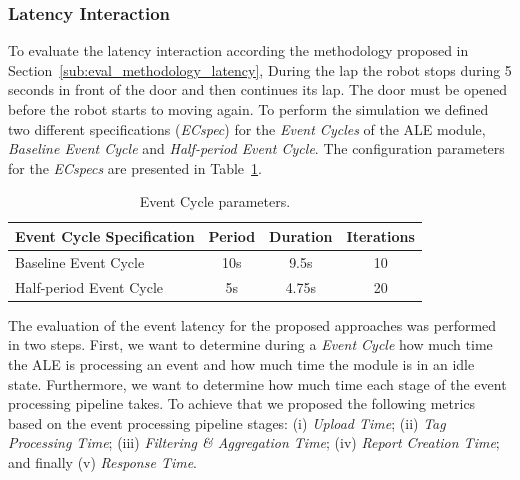 \subsubsection{Latency Interaction}
\label{subs:eval_exp_latency}
To evaluate the latency interaction according the methodology proposed in Section~\ref{sub:eval_methodology_latency},
During the lap the robot stops during 5 seconds in front of the door and then continues its lap.
The door must be opened before the robot starts to moving again. To perform the simulation we defined
two different specifications (\textit{ECspec}) for the \textit{Event Cycles} of the \gls{ALE} module,
\textit{Baseline Event Cycle} and \textit{Half-period Event Cycle}. The configuration parameters
for the \textit{ECspecs} are presented in Table~\ref{table:ecspec_parameters}.

\begin{table}[ht!]
 \begin{tabular}{|l|c|c|c|}
  \hline
  Event Cycle Specification & Period  & Duration & Iterations  \\ \hline
  Baseline Event Cycle      &  10s    & 9.5s     & 10          \\ \hline
  Half-period Event Cycle   &   5s    & 4.75s    & 20          \\ \hline
 \end{tabular}
 \caption[Event Cycle parameters.]{Event Cycle parameters.}
 \label{table:ecspec_parameters}
\end{table}

The evaluation of the event latency for the proposed approaches was performed in two steps. First,
we want to determine during a \textit{Event Cycle} how much time the \gls{ALE} is processing an event
and how much time the module is in an idle state. Furthermore, we want to determine how much time
each stage of the event processing pipeline takes. To achieve that we proposed the following metrics
based on the event processing pipeline stages: (i) \textit{Upload Time}; (ii) \textit{Tag Processing Time};
(iii) \textit{Filtering \& Aggregation Time}; (iv) \textit{Report Creation Time}; and finally (v)
\textit{Response Time}.

